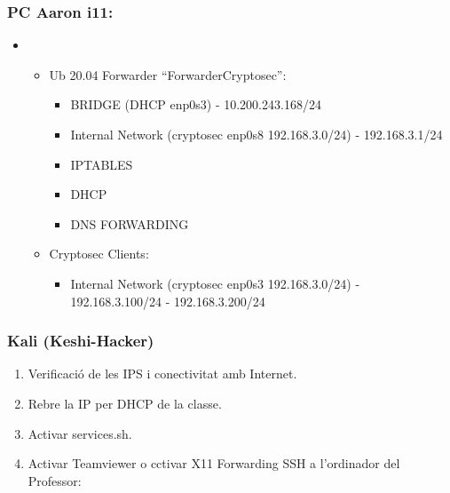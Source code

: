 \documentclass[]{article}
\providecommand{\tightlist}{%
  \setlength{\itemsep}{0pt}\setlength{\parskip}{0pt}}
\begin{document}
\hypertarget{pc-aaron-i11}{%
\subsubsection{\texorpdfstring{\textbf{PC Aaron
i11}:}{PC Aaron i11:}}\label{pc-aaron-i11}}

\begin{itemize}
\item
  \begin{itemize}
  \item
    Ub 20.04 Forwarder ``ForwarderCryptosec'':

    \begin{itemize}
    \item
      BRIDGE (DHCP enp0s3) - 10.200.243.168/24
    \item
      Internal Network (cryptosec enp0s8 192.168.3.0/24) -
      192.168.3.1/24
    \item
      IPTABLES
    \item
      DHCP
    \item
      DNS FORWARDING
    \end{itemize}
  \item
    Cryptosec Clients:

    \begin{itemize}
    \tightlist
    \item
      Internal Network (cryptosec enp0s3 192.168.3.0/24) -
      192.168.3.100/24 ​​- 192.168.3.200/24
    \end{itemize}
  \end{itemize}
\end{itemize}

\hypertarget{kali-keshi-hacker}{%
\subsubsection{\texorpdfstring{\textbf{Kali
(Keshi-Hacker)}}{Kali (Keshi-Hacker)}}\label{kali-keshi-hacker}}

\begin{enumerate}
\def\labelenumi{\arabic{enumi}.}
\item
  Verificació de les IPS i conectivitat amb Internet.
\item
  Rebre la IP per DHCP de la classe.
\item
  Activar services.sh.
\item
  Activar Teamviewer o cctivar X11 Forwarding SSH a l'ordinador del
  Professor:
\end{enumerate}
\end{document}
